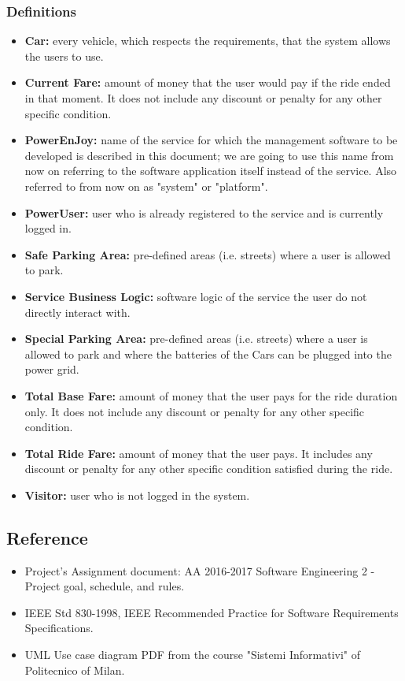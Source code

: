 \subsubsection{Definitions}
\begin{itemize}
\item \textbf{Car:} every vehicle, which respects the requirements, that the system allows the users to use.
\item \textbf{Current Fare:} amount of money that the user would pay if the ride ended in that moment. It does not include any discount or penalty for any other specific condition.
\item \textbf{PowerEnJoy:} name of the service for which the management software to be developed is described in this document; we are going to use this name from now on referring to the software application itself instead of the service. Also referred to from now on as "system" or "platform".
\item \textbf{PowerUser:} user who is already registered to the service and is currently logged in.
\item \textbf{Safe Parking Area:} pre-defined areas (i.e. streets) where a user is allowed to park.
\item \textbf{Service Business Logic:} software logic of the service the user do not directly interact with. 
\item \textbf{Special Parking Area:}  pre-defined areas (i.e. streets) where a user is allowed to park and where the batteries of the Cars can be plugged into the power grid.
\item \textbf{Total Base Fare:} amount of money that the user pays for the ride duration only. It does not include any discount or penalty for any other specific condition.
\item \textbf{Total Ride Fare:} amount of money that the user pays. It includes any discount or penalty for any other specific condition satisfied during the ride.
\item \textbf{Visitor:} user who is not logged in the system.
\end{itemize}
\subsection{Reference}
\begin{itemize}
\item Project's Assignment document: AA 2016-2017 Software Engineering 2 - Project goal, schedule, and rules.
\item IEEE Std 830-1998, IEEE Recommended Practice for Software Requirements Specifications.
\item UML Use case diagram PDF from the course "Sistemi Informativi" of Politecnico of Milan.
\end{itemize}
